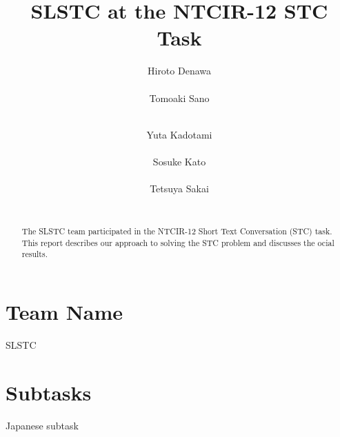 \documentclass{../style/sig-alternate}
\begin{document}
\title{SLSTC at the NTCIR-12 STC Task}

\author{
%
%
\alignauthor
Hiroto Denawa\\
       \\
\alignauthor
Tomoaki Sano\\
       \\
\and  %
\alignauthor
Yuta Kadotami\\
       \\
\alignauthor
Sosuke Kato\\
       \\
\alignauthor
Tetsuya Sakai\\
       \\
}

\maketitle

\begin{abstract}
The SLSTC team participated in the NTCIR-12 Short Text Conversation
(STC) task.
This report describes our approach to solving the STC problem and discusses the
ocial results.
\end{abstract}

\section*{Team Name}
SLSTC

\section*{Subtasks}
Japanese subtask
\end{document}
